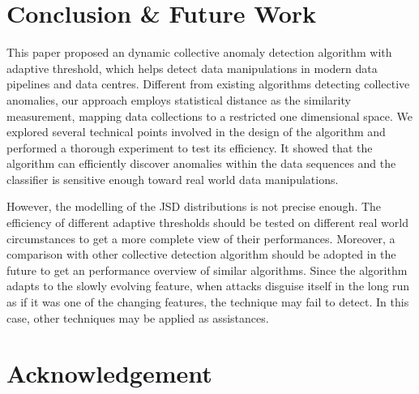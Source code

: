 \documentclass[a4paper]{IEEEtran}
\begin{document}
\begin{table}[!ht]
			\end{table}
		
			
	\section{Conclusion \& Future Work}\label{sec:conclusion}
		This paper proposed an dynamic collective anomaly detection algorithm with adaptive threshold, which helps detect data manipulations in modern data pipelines and data centres. Different from existing algorithms detecting collective anomalies, our approach employs statistical distance as the similarity measurement, mapping data collections to a restricted one dimensional space. We explored several technical points involved in the design of the algorithm and performed a thorough experiment to test its efficiency. It showed that the algorithm can efficiently discover anomalies within the data sequences and the classifier is sensitive enough toward real world data manipulations.
		
		However, the modelling of the JSD distributions is not precise enough. The efficiency of different adaptive thresholds should be tested on different real world circumstances to get a more complete view of their performances. Moreover, a comparison with other collective detection algorithm should be adopted in the future to get an performance overview of similar algorithms. Since the algorithm adapts to the slowly evolving feature, when attacks disguise itself in the long run as if it was one of the changing features, the technique may fail to detect. In this case, other techniques may be applied as assistances.
	
	\section*{Acknowledgement}
		
	\printbibliography
\end{document}
